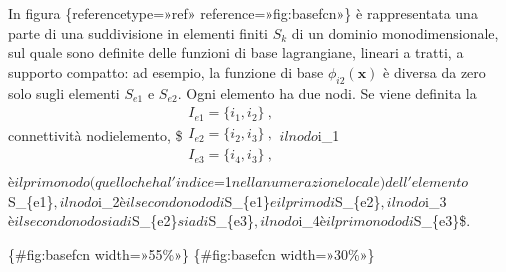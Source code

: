 \documentclass[letterpaper,10pt,italian]{jupyterBook}
\begin{document}
\sphinxAtStartPar
In figura \{reference\sphinxhyphen{}type=»ref»
reference=»fig:base\sphinxhyphen{}fcn»\} è rappresentata una parte di una suddivisione
in elementi finiti \(S_{k}\) di un dominio monodimensionale, sul quale
sono definite delle funzioni di base lagrangiane, lineari a tratti, a
supporto compatto: ad esempio, la funzione di base \(\phi_{i2}(\bm{x})\) è
diversa da zero solo sugli elementi \(S_{e1}\) e \(S_{e2}\). Ogni elemento
ha due nodi. Se viene definita la connettività nodi\sphinxhyphen{}elemento,
\$\(\label{eqn:conn:ex}
  \begin{aligned}
    I_{e1} = \{ i_1 , i_2 \} \ , \\
    I_{e2} = \{ i_2 , i_3 \} \ , \\
    I_{e3} = \{ i_4 , i_3 \} \ , \\
  \end{aligned}\)\( il nodo \)i\_1\( è il primo nodo (quello che ha l'indice
\)=1\( nella numerazione locale) dell'elemento \)S\_\{e1\}\(, il nodo \)i\_2\( è
il secondo nodo di \)S\_\{e1\}\( e il primo di \)S\_\{e2\}\(, il nodo \)i\_3\( è il
secondo nodo sia di \)S\_\{e2\}\( sia di \)S\_\{e3\}\(, il nodo \)i\_4\( è il primo
nodo di \)S\_\{e3\}\$.

\sphinxAtStartPar
{}\{\#fig:base\sphinxhyphen{}fcn
width=»55\%»\} \{\#fig:base\sphinxhyphen{}fcn
width=»30\%»\}
\end{document}

